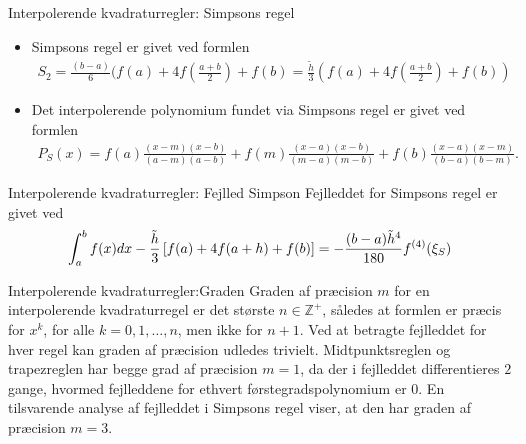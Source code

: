 \begin{frame}{Interpolerende kvadraturregler: Simpsons regel}
    \begin{itemize}
    \item Simpsons regel er givet ved formlen 
    \begin{align*}
    S_2 = \frac{(b-a)}{6}(f(a)+4f(\frac{a+b}{2})+f(b)=\frac{\widetilde{h}}{3}(f(a)+4f(\frac{a+b}{2})+f(b))
    \end{align*}
    \item Det interpolerende polynomium fundet via Simpsons regel er givet ved formlen
    \begin{align*}
    P_{S}(x)=f(a)\frac{(x-m)(x-b)}{(a-m)(a-b)}+f(m)\frac{(x-a)(x-b)}{(m-a)(m-b)}+f(b)\frac{(x-a)(x-m)}{(b-a)(b-m)}.
    \end{align*}
       \end{itemize}
\end{frame}


\begin{frame}{Interpolerende kvadraturregler: Fejlled Simpson}
    Fejlleddet for Simpsons regel er givet ved 
    \begin{align*}
    \int_{a}^{b}f(x)dx-\frac{\Tilde{h}}{3}\left [ f(a)+4f(a+h) + f(b) \right ]=-\frac{(b-a)\Tilde{h}^4}{180}{f}^{(4)}(\xi_S)
    \end{align*}
    
\end{frame}


\begin{frame}{Interpolerende kvadraturregler:Graden}
    Graden af præcision $m$ for en interpolerende kvadraturregel er det største $n \in \mathbb{Z^+}$, således at formlen er præcis for $x^k$, for alle $k = 0, 1, \ldots , n$, men ikke for $n+1$.
    Ved at betragte fejlleddet for hver regel kan graden af præcision udledes trivielt. 
    Midtpunktsreglen og trapezreglen har begge grad af præcision $m=1$, da der i fejlleddet differentieres $2$ gange, hvormed fejlleddene for ethvert førstegradspolynomium er $0$. 
    En tilsvarende analyse af fejlleddet i Simpsons regel viser, at den har graden af præcision $m=3$.
\end{frame}